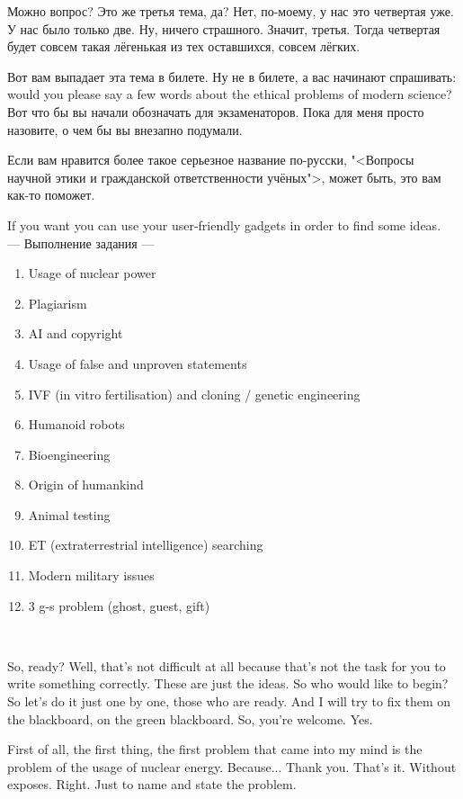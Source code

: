 \documentclass[main.tex]{subfiles}
\begin{document}
Можно вопрос? Это же третья тема, да? Нет, по-моему, у нас это четвертая уже.
У нас было только две.
Ну, ничего страшного.
Значит, третья.
Тогда четвертая будет совсем такая лёгенькая из тех оставшихся, совсем лёгких.

Вот вам выпадает эта тема в билете.
Ну не в билете, а вас начинают спрашивать: would you please say a few words about the ethical problems of modern science?
Вот что бы вы начали обозначать для экзаменаторов.
Пока для меня просто назовите, о чем бы вы внезапно подумали.

Если вам нравится более такое серьезное название по-русски, "<Вопросы научной этики и гражданской ответственности учёных">, может быть, это вам как-то поможет.

If you want you can use your user-friendly gadgets in order to find some ideas.
\\

--- Выполнение задания ---
\\


\begin{enumerate}[nosep,leftmargin=10mm]
	\itemsep\eitsp
	\item Usage of nuclear power
	\item Plagiarism
	\item AI and copyright
	\item Usage of false and unproven statements
	\item IVF (in vitro fertilisation) and cloning / genetic engineering
	\item Humanoid robots
	\item Bioengineering
	\item Origin of humankind
	\item Animal testing
	\item ET (extraterrestrial intelligence) searching
	\item Modern military issues
	\item 3 g-s problem (ghost, guest, gift)
\end{enumerate}
\ 

So, ready?
Well, that's not difficult at all because that's not the task for you to write something correctly.
These are just the ideas.
So who would like to begin?
So let's do it just one by one, those who are ready.
And I will try to fix them on the blackboard, on the green blackboard.
So, you're welcome.
Yes.

First of all, the first thing, the first problem that came into my mind is the problem of the usage of nuclear energy.
Because... Thank you. That's it. Without exposes. Right. Just to name and state the problem.
\end{document}
